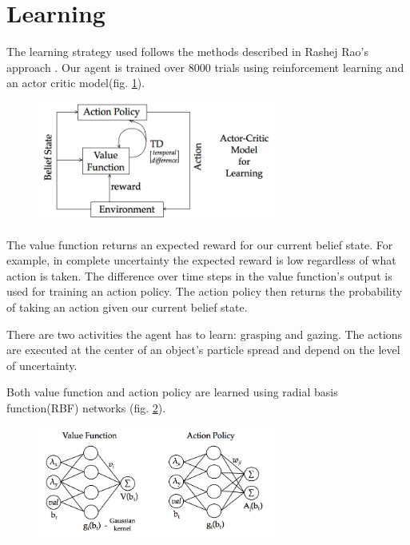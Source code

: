 \documentclass[11]{article}
\begin{document}
\section{Learning}
The learning strategy used follows the methods described in Rashej Rao's approach \cite{rashejrao}. Our agent is trained over 8000 trials using reinforcement learning and an actor critic model(fig. \ref{fig:actor-critic}). 
\begin{figure}[h]
	\centering
	\includegraphics[width=0.7\textwidth]{actorcritic.png}
	\caption{}
	\label{fig:actor-critic}
\end{figure} 

The value function returns an expected reward for our current belief state. For example, in complete uncertainty the expected reward is low regardless of what action is taken. The difference over time steps in the value function's output is used for training an action policy. The action policy then returns the probability of taking an action given our current belief state.

There are two activities the agent has to learn: grasping and gazing. The actions are executed at the center of an object's particle spread and depend on the level of uncertainty. 

Both value function and action policy are learned using radial basis function(RBF) networks (fig. \ref{fig:rbf}).

\begin{figure}[h]
	\centering
	\includegraphics[width=0.7\textwidth]{rbf.png}
	\caption{}
	\label{fig:rbf}
\end{figure} 
\end{document}
